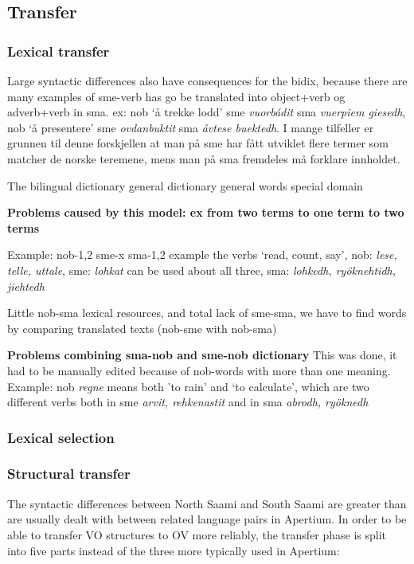 \documentclass[a4paper,11pt,twocolumn]{article}
\begin{document}
\subsection{Transfer}

\subsubsection{Lexical transfer}
Large syntactic differences also have consequences for the bidix, because there are many examples of sme-verb has go be translated into object+verb og adverb+verb in sma.
ex: nob `å trekke lodd' sme \textit{vuorbádit} sma \textit{vuerpiem giesedh}, 
nob `å presentere' sme \textit{ovdanbuktit} sma \textit{åvtese buektedh}. 
I mange tilfeller er grunnen til denne  forskjellen at man på sme har fått utviklet flere termer som matcher de norske teremene, mens man på sma
fremdeles må forklare innholdet.



The bilingual dictionary
general dictionary
general words
special domain

\textbf{Problems caused by this model: ex from two terms to one term to two terms}

Example: nob-1,2   sme-x   sma-1,2
example the verbs ‘read, count, say’, nob: \textit{lese, telle, uttale}, sme: \textit{lohkat} can be used about all three, sma: \textit{lohkedh, ryöknehtidh, jiehtedh} 

Little nob-sma lexical resources, and total lack of sme-sma, we have to find words by comparing translated texts (nob-sme with nob-sma)

\textbf{Problems combining sma-nob and sme-nob dictionary}
This was done, it had to be manually edited because of nob-words with more than one meaning. 
Example: nob \textit{regne} means both 'to rain' and ‘to calculate’, 
which are two different verbs both in sme \textit{arvit, rehkenastit} and in sma \textit{abrodh, ryöknedh}

\subsubsection{Lexical selection}

\subsubsection{Structural transfer}

The syntactic differences between North Saami and South Saami are
greater than are usually dealt with between related language pairs
in Apertium. 
In order to be able to transfer VO structures to OV more reliably,
the transfer phase is split into five parts instead of the three
more typically used in Apertium:
\end{document}
